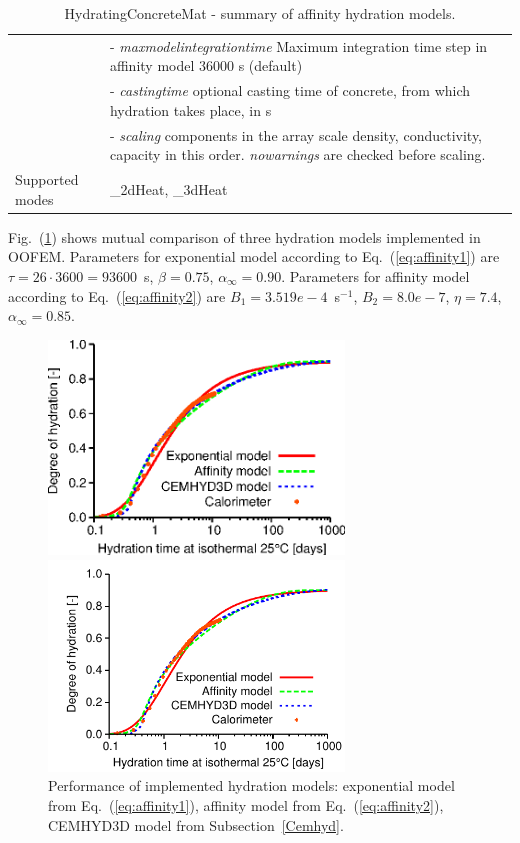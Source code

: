 \documentclass[a4paper]{article}
\newcommand{\param}[1]{{\it #1}}
\newcommand{\refeq}[1]{Eq.~(\ref{#1})}
\newcommand{\reffig}[1]{Fig.~(\ref{#1})}
\begin{document}
\begin{table}[!htb]
\begin{tabular}{|l|p{9cm}|}
&- \param{maxmodelintegrationtime} Maximum integration time step in affinity model 36000 s (default)\\
&- \param{castingtime} optional casting time of concrete, from which hydration takes place, in s\\
&- \param{scaling} components in the array scale density, conductivity, capacity in this order. \param{nowarnings} are checked before scaling.\\
Supported modes& \_2dHeat, \_3dHeat\\
\hline
\end{tabular}
\caption{HydratingConcreteMat - summary of affinity hydration models.}
\label{Affinity1_table}
\end{table}

\reffig{hydration_comparison} shows mutual comparison of three hydration models implemented in OOFEM. Parameters for exponential model according to \refeq{eq:affinity1} are $\tau=26\cdot3600=93600$~s, $\beta=0.75$, $\alpha_\infty=0.90$. Parameters for affinity model according to \refeq{eq:affinity2} are $B_1=3.519e-4$~s$^{-1}$, $B_2=8.0e-7$, $\eta=7.4$, $\alpha_\infty=0.85$.

\begin{figure}[!htb]
\begin{htmlonly}
  \centerline{\includegraphics[width=0.7\textwidth]{Mokra_OOFEM_affinity_time.eps}}
\end{htmlonly}
 \centerline{\includegraphics[width=0.7\textwidth]{Mokra_OOFEM_affinity_time}}
  \caption{Performance of implemented hydration models: exponential model from \refeq{eq:affinity1}, affinity model from \refeq{eq:affinity2}, CEMHYD3D model from Subsection~\ref{Cemhyd}.}
  \label{hydration_comparison}
\end{figure}
\end{document}
